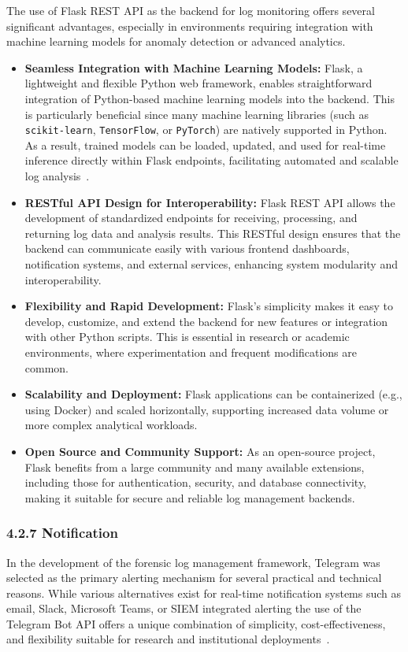 The use of Flask REST API as the backend for log monitoring offers several significant advantages, especially in environments requiring integration with machine learning models for anomaly detection or advanced analytics.

\begin{itemize}
	\item \textbf{Seamless Integration with Machine Learning Models:} Flask, a lightweight and flexible Python web framework, enables straightforward integration of Python-based machine learning models into the backend. This is particularly beneficial since many machine learning libraries (such as \texttt{scikit-learn}, \texttt{TensorFlow}, or \texttt{PyTorch}) are natively supported in Python. As a result, trained models can be loaded, updated, and used for real-time inference directly within Flask endpoints, facilitating automated and scalable log analysis~\cite{garg2023preserving}.
	
	\item \textbf{RESTful API Design for Interoperability:} Flask REST API allows the development of standardized endpoints for receiving, processing, and returning log data and analysis results. This RESTful design ensures that the backend can communicate easily with various frontend dashboards, notification systems, and external services, enhancing system modularity and interoperability.
	
	\item \textbf{Flexibility and Rapid Development:} Flask’s simplicity makes it easy to develop, customize, and extend the backend for new features or integration with other Python scripts. This is essential in research or academic environments, where experimentation and frequent modifications are common.
	
	\item \textbf{Scalability and Deployment:} Flask applications can be containerized (e.g., using Docker) and scaled horizontally, supporting increased data volume or more complex analytical workloads.
	
	\item \textbf{Open Source and Community Support:} As an open-source project, Flask benefits from a large community and many available extensions, including those for authentication, security, and database connectivity, making it suitable for secure and reliable log management backends.
\end{itemize}


\subsubsection{4.2.7 Notification}
In the development of the forensic log management framework, Telegram was selected as the primary alerting mechanism for several practical and technical reasons. While various alternatives exist for real-time notification systems such as email, Slack, Microsoft Teams, or SIEM integrated alerting the use of the Telegram Bot API offers a unique combination of simplicity, cost-effectiveness, and flexibility suitable for research and institutional deployments~\cite{wang2023telegramalert}.

